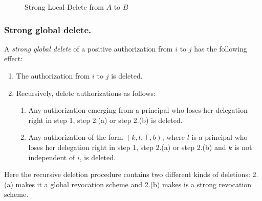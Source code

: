 \documentclass[runningheads]{llncs}
\begin{document}
\vspace{-3mm}
\begin{figure}[H]
\center
{}
\vspace{-1mm}
\caption{Strong Local Delete from $A$ to $B$}
\end{figure}
\vspace{-7mm}

\subsubsection{Strong global delete.}
A \emph{strong global delete} of a positive authorization from $i$ to $j$ has the following effect:
\vspace{-1mm}
\begin{enumerate}
 \item The authorization from $i$ to $j$ is deleted.
 \item Recursively, delete authorizations as follows:
 \begin{enumerate}
  \item Any authorization emerging from a principal who loses her delegation right in step 1, step 2.(a) or step 2.(b) is deleted.
  \item Any authorization of the form $(k,l,\top,b)$, where $l$ is a principal who loses her delegation right in step 1, step 2.(a) or step 2.(b) and $k$ is not independent of $i$, is deleted.
 \end{enumerate}
\end{enumerate}
\vspace{-1mm}
Here the recursive deletion procedure contains two different kinds of deletions: 2.(a) makes it a global revocation scheme and 2.(b) makes is a strong revocation scheme.
\end{document}
